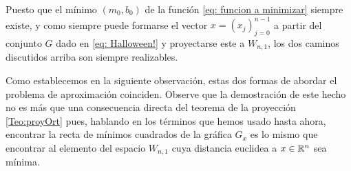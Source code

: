 Puesto que el mínimo 
$(m_{0}, b_{0})$ de la función 
\eqref{eq: funcion a minimizar} siempre existe,
y como siempre puede formarse el vector
$x=(x_{j})_{j=0}^{n-1}$ a partir del conjunto $G$
dado en \eqref{eq: Halloween!} 
y proyectarse este
a $W_{n,1}$, los dos caminos discutidos arriba
son siempre realizables.


\noindent Como establecemos en la siguiente observación, estas
dos formas de abordar el problema de aproximación
coinciden. Observe que la demostración de este hecho 
no es más que una consecuencia directa del 
teorema de la proyección \ref{Teo:proyOrt}
pues, hablando en los términos que hemos
usado hasta ahora, encontrar la recta de mínimos
cuadrados de la 
gráfica $G_{x}$ es lo mismo que encontrar al elemento
del espacio $W_{n,1}$ cuya distancia euclidea a $x \in \mathbb{R}^{n}$
sea mínima.



